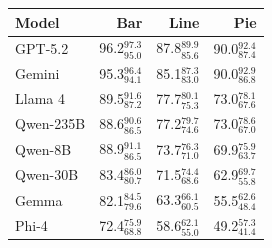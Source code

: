 

\small
\begin{tabular}{@{}lrrr@{}}
\toprule
\textbf{Model} & \textbf{Bar} & \textbf{Line} & \textbf{Pie} \\
\midrule
GPT-5.2 & 96.2$_{\scriptstyle 95.0}^{\scriptstyle 97.3}$ & 87.8$_{\scriptstyle 85.6}^{\scriptstyle 89.9}$ & 90.0$_{\scriptstyle 87.4}^{\scriptstyle 92.4}$ \\
Gemini & 95.3$_{\scriptstyle 94.1}^{\scriptstyle 96.4}$ & 85.1$_{\scriptstyle 83.0}^{\scriptstyle 87.3}$ & 90.0$_{\scriptstyle 86.8}^{\scriptstyle 92.9}$ \\
Llama 4 & 89.5$_{\scriptstyle 87.2}^{\scriptstyle 91.6}$ & 77.7$_{\scriptstyle 75.3}^{\scriptstyle 80.1}$ & 73.0$_{\scriptstyle 67.6}^{\scriptstyle 78.1}$ \\
Qwen-235B & 88.6$_{\scriptstyle 86.5}^{\scriptstyle 90.6}$ & 77.2$_{\scriptstyle 74.6}^{\scriptstyle 79.7}$ & 73.0$_{\scriptstyle 67.0}^{\scriptstyle 78.6}$ \\
Qwen-8B & 88.9$_{\scriptstyle 86.5}^{\scriptstyle 91.1}$ & 73.7$_{\scriptstyle 71.0}^{\scriptstyle 76.3}$ & 69.9$_{\scriptstyle 63.7}^{\scriptstyle 75.9}$ \\
Qwen-30B & 83.4$_{\scriptstyle 80.7}^{\scriptstyle 86.0}$ & 71.5$_{\scriptstyle 68.6}^{\scriptstyle 74.4}$ & 62.9$_{\scriptstyle 55.8}^{\scriptstyle 69.7}$ \\
Gemma & 82.1$_{\scriptstyle 79.6}^{\scriptstyle 84.5}$ & 63.3$_{\scriptstyle 60.5}^{\scriptstyle 66.1}$ & 55.5$_{\scriptstyle 48.4}^{\scriptstyle 62.6}$ \\
Phi-4 & 72.4$_{\scriptstyle 68.8}^{\scriptstyle 75.9}$ & 58.6$_{\scriptstyle 55.0}^{\scriptstyle 62.1}$ & 49.2$_{\scriptstyle 41.4}^{\scriptstyle 57.3}$ \\
\bottomrule
\end{tabular}
\label{tab:mqm-chart-type}

